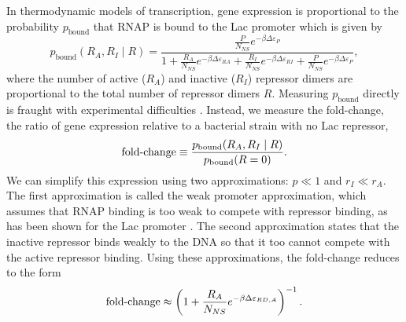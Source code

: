 In thermodynamic models of transcription, gene expression is proportional to the
probability $p_{\text{bound}}$ that RNAP is bound to the Lac promoter which is
given by 
\begin{equation}\label{eq2}
p_{\text{bound}}(R_A, R_I \mid R)=\frac{\frac{P}{N_{NS}}e^{-\beta  \Delta\varepsilon_{P}}}{1+\frac{R_A}{N_{NS}}e^{-\beta \Delta\varepsilon_{RA}}+\frac{R_I}{N_{NS}}e^{-\beta  \Delta\varepsilon_{RI}}+\frac{P}{N_{NS}}e^{-\beta  \Delta\varepsilon_{P}}},
\end{equation}
where the number of active ($R_A$) and inactive ($R_I$) repressor dimers are proportional to the total number of repressor dimers $R$.
Measuring $p_{\text{bound}}$ directly is fraught with experimental difficulties \cite{Bintu2005}. Instead, we measure the fold-change, the ratio of gene expression relative to a bacterial strain with no Lac repressor, 
\begin{equation}\label{eq3}
\foldchange\equiv \frac{p_{\text{bound}}(R_A, R_I \mid R)}{p_{\text{bound}}(R = 0)}.%
\end{equation}
We can simplify this expression using two approximations: \(p\ll 1\) and
\(r_I\ll r_A\). The first approximation is called the weak promoter
approximation, which assumes that RNAP binding is too weak to compete with
repressor binding, as has been shown for the Lac promoter \cite{Brewster2012}.
The second approximation states that the inactive repressor binds weakly to the
DNA so that it too cannot compete with the active repressor binding. Using these
approximations, the fold-change reduces to the form 
\begin{equation}\label{eq4}
\operatorname{fold-change} \approx \left(1+\frac{R_A}{N_{NS}}e^{-\beta  \Delta\varepsilon_{RD,A}}\right)^{-1}.
\end{equation}

